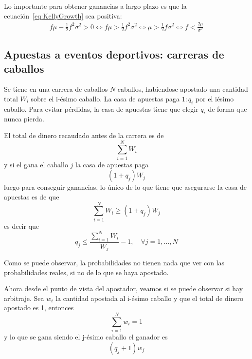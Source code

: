 Lo importante para obtener ganancias a largo plazo es que la ecuación~\eqref{eq:KellyGrowth} sea positiva:
\begin{align*}
    f\mu - \frac{1}{2}f^2\sigma^2 > 0 \Leftrightarrow f\mu > \frac{1}{2}f^2\sigma^2 \Leftrightarrow \mu > \frac{1}{2}f\sigma^2 \Leftrightarrow \boxed{f < \frac{2\mu}{\sigma^2}}
\end{align*}







\subsection{Apuestas a eventos deportivos: carreras de caballos}
Se tiene en una carrera de caballos $N$ caballos, habiendose apostado una cantidad total $W_i$ sobre el i-ésimo caballo. La casa de apuestas paga $1:q_i$ por el iésimo caballo. Para evitar pérdidas, la casa de apuestas tiene que elegir $q_i$ de forma que nunca pierda.

El total de dinero recaudado antes de la carrera es de
\[
    \sum_{i=1}^N W_i
\]
y si el gana el caballo $j$ la casa de apuestas paga 
\[
    (1+q_j)W_j
\]
luego para conseguir ganancias, lo único de lo que tiene que asegurarse la casa de apuestas es de que
\[
    \sum_{i=1}^N W_i \geq (1+q_j)W_j
\]
es decir que
\[
    \boxed{q_j \leq \frac{\sum_{i=1}^N W_i}{W_j} - 1, \quad \forall j=1,\ldots,N}
\]

Como se puede observar, la probabilidades no tienen nada que ver con las probabilidades reales, si no de lo que se haya apostado.





Ahora desde el punto de vista del apostador, veamos si se puede observar si hay arbitraje. Sea $w_i$ la cantidad apostada al i-ésimo caballo y que el total de dinero apostado es 1, entonces
\[
    \sum_{i=1}^N w_i = 1
\]
y lo que se gana siendo el j-ésimo caballo el ganador es
\[
    (q_j + 1)w_j
\]

